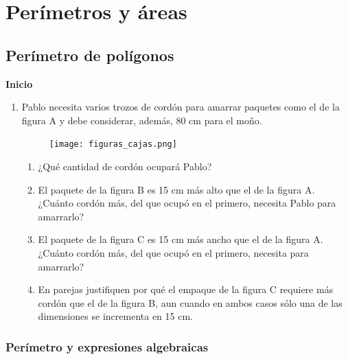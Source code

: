 \documentclass[11pt]{book}
\begin{document}
\newpage \thispagestyle{plain}
\section{Perímetros y áreas}

\subsection{Perímetro de polígonos}

\begin{boxK}
  \begin{center}\textbf{Inicio}\end{center}

  \begin{enumerate}
    \item Pablo necesita varios trozos de cordón para amarrar paquetes como el de la figura A y
          debe considerar, además, 80 cm para el moño.
          \begin{figure}[H]
            \centering
            \texttt{[image: figuras\_cajas.png]}
            \label{fig:figuras_cajas}
          \end{figure}
          \begin{enumerate}
            \item ¿Qué cantidad de cordón ocupará Pablo?
            \item El paquete de la figura B es 15 cm más alto que el de la figura A. ¿Cuánto cordón más, del que ocupó en el primero, necesita Pablo para amarrarlo?
            \item El paquete de la figura C es 15 cm más ancho que el de la figura A. ¿Cuánto cordón más, del que ocupó en el primero, necesita para amarrarlo?
            \item En parejas justifiquen por qué el empaque de la figura C requiere más cordón que el de la figura B, aun cuando en ambos casos sólo una de las dimensiones se incrementa en 15 cm.
          \end{enumerate}
  \end{enumerate}
\end{boxK}

\subsubsection{Perímetro y expresiones algebraicas}
\end{document}
